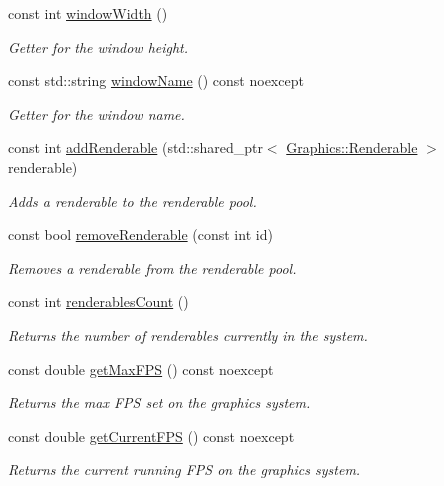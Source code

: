 \begin{DoxyCompactItemize}
const int \hyperlink{class_graphics_1_1_graphics_system_adab3606d554a85ca13aaaec29ceee68c}{window\+Width} ()
\begin{DoxyCompactList}\small\item\em Getter for the window height. \end{DoxyCompactList}\item 
const std\+::string \hyperlink{class_graphics_1_1_graphics_system_a691efb4de942f8da79ecbcf626280724}{window\+Name} () const noexcept
\begin{DoxyCompactList}\small\item\em Getter for the window name. \end{DoxyCompactList}\item 
const int \hyperlink{class_graphics_1_1_graphics_system_ac35c2d3d32e1264b8daad6d59c3aba57}{add\+Renderable} (std\+::shared\+\_\+ptr$<$ \hyperlink{class_graphics_1_1_renderable}{Graphics\+::\+Renderable} $>$ renderable)
\begin{DoxyCompactList}\small\item\em Adds a renderable to the renderable pool. \end{DoxyCompactList}\item 
const bool \hyperlink{class_graphics_1_1_graphics_system_a476b0e6945c37c7b2d48bddcf246a389}{remove\+Renderable} (const int id)
\begin{DoxyCompactList}\small\item\em Removes a renderable from the renderable pool. \end{DoxyCompactList}\item 
const int \hyperlink{class_graphics_1_1_graphics_system_a2b37c3e6f53707002c72c38062be6617}{renderables\+Count} ()
\begin{DoxyCompactList}\small\item\em Returns the number of renderables currently in the system. \end{DoxyCompactList}\item 
const double \hyperlink{class_graphics_1_1_graphics_system_a3266a6af7dd48b4e0501953a5a92d9ee}{get\+Max\+F\+P\+S} () const noexcept
\begin{DoxyCompactList}\small\item\em Returns the max F\+P\+S set on the graphics system. \end{DoxyCompactList}\item 
const double \hyperlink{class_graphics_1_1_graphics_system_a155246106fb6bf556caab7ff9e826524}{get\+Current\+F\+P\+S} () const noexcept
\begin{DoxyCompactList}\small\item\em Returns the current running F\+P\+S on the graphics system. \end{DoxyCompactList}\item 

\end{DoxyCompactItemize}
